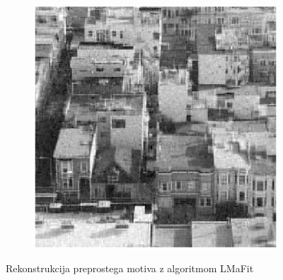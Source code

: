 \begin{figure}
\begin{subfigure}{0.325\linewidth}
    \end{subfigure}
    \hfill
    \begin{subfigure}{0.325\linewidth}
        \includegraphics[width=\linewidth]{Poglavja/Slike/kompleksna grayscale 300/rez60LMaFit.png}
    \end{subfigure}
    \caption{Rekonstrukcija preprostega motiva z algoritmom LMaFit}
\end{figure}